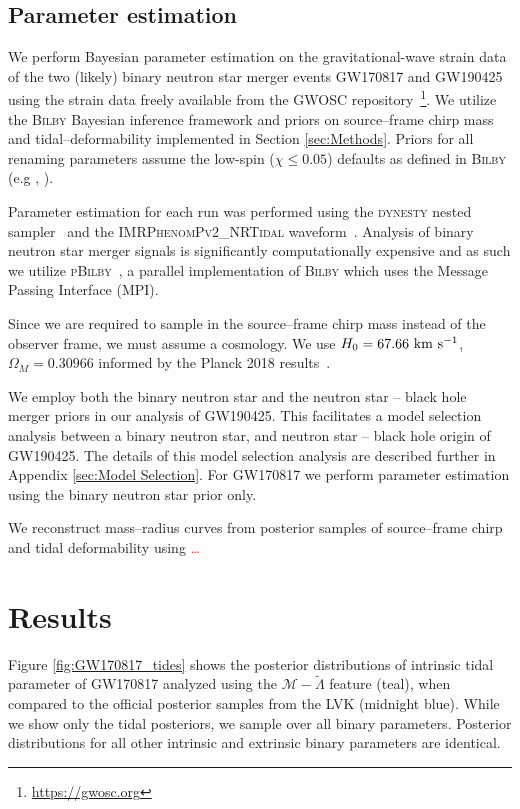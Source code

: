 \documentclass[twocolumn]{aastex631}
\newcommand{\red}[1]{\textcolor{red}{#1}}
\begin{document}
\subsection{Parameter estimation}
We perform Bayesian parameter estimation on the gravitational-wave strain data of the two (likely) binary neutron star merger events GW170817 and GW190425 using the strain data freely available from the GWOSC repository~\footnote{\url{https://gwosc.org}}. 
We utilize the \textsc{Bilby} Bayesian inference framework and priors on source--frame chirp mass and tidal--deformability implemented in Section \ref{sec:Methods}. Priors for all renaming parameters assume the low-spin ($\chi \leq 0.05$) defaults as defined in \textsc{Bilby} (e.g \citealt{ashton19}, \citealt{romeroshaw20}).
	
Parameter estimation for each run was performed using the \textsc{dynesty} nested sampler~\citep{Dynesty} and the \textsc{IMRPhenomPv2\_NRTidal} waveform~\citep{IMRPhenomP_NRtidal}. Analysis of binary neutron star merger signals is significantly computationally expensive and as such we utilize \textsc{pBilby}~\citep{pbilby}, a parallel implementation of \textsc{Bilby} which uses the Message Passing Interface (MPI). 
	
Since we are required to sample in the source--frame chirp mass instead of the observer frame, we must assume a cosmology. We use $H_0=67.66 \rm  \ km  \ s^{-1}$, $\Omega_M = 0.30966 $ informed by the Planck 2018 results~\citep{Planck}.  
	
We employ both the binary neutron star and the neutron star -- black hole merger priors in our analysis of GW190425. This facilitates a model selection analysis between a binary neutron star, and neutron star -- black hole origin of GW190425. The details of this model selection analysis are described further in Appendix \ref{sec:Model Selection}. 
For GW170817 we perform parameter estimation using the binary neutron star prior only. 
	
We reconstruct mass--radius curves from posterior samples of source--frame chirp and tidal deformability using \red{\ldots}
	
	
\section{Results} \label{sec:Results}
	
	
Figure \ref{fig:GW170817_tides} shows the posterior distributions of intrinsic tidal parameter of GW170817 analyzed using the $\mathcal{M}-\tilde{\Lambda}$ feature (teal), when compared to the official posterior samples from the LVK (midnight blue).
While we show only the tidal posteriors, we sample over all binary parameters. Posterior distributions for all other intrinsic and extrinsic binary parameters are identical. 
	
\end{document}
